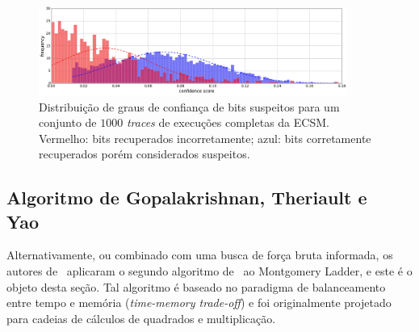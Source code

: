\documentclass{SBCbookchapter}
\begin{document}
\begin{figure}[h!tb]
	\centering   %
	\includegraphics[width=0.9\textwidth]{figures/SAC_2016__pointer_cswap_attack__hist-conf-all-traces__n_trset_40.png}
	\caption{
	Distribuição de graus de confiança de bits suspeitos para um conjunto de $1000$ \emph{traces} de execuções completas da ECSM. Vermelho: bits recuperados incorretamente; azul: bits corretamente recuperados porém considerados suspeitos.
	}		
	\vspace{.5mm}
	\label{fig:hist-conf-all-traces__n_trset_40}
\end{figure}

\subsection{Algoritmo de Gopalakrishnan, Theriault e Yao~\cite{GopalakrishnanTheriaultYao07}} %
\label{sec:alg-keyrecv-Gopalakrishnan}

Alternativamente, ou combinado com uma busca de força bruta informada, os autores de~\cite{Nascimento2016_SAC} aplicaram o segundo algoritmo de~\cite{Gopalakrishnan2007} ao Montgomery Ladder, e este é o objeto desta seção. Tal algoritmo é baseado no paradigma de balanceamento entre tempo e memória (\textit{time-memory trade-off}) e foi originalmente projetado para cadeias de cálculos de quadrados e multiplicação.
\end{document}
